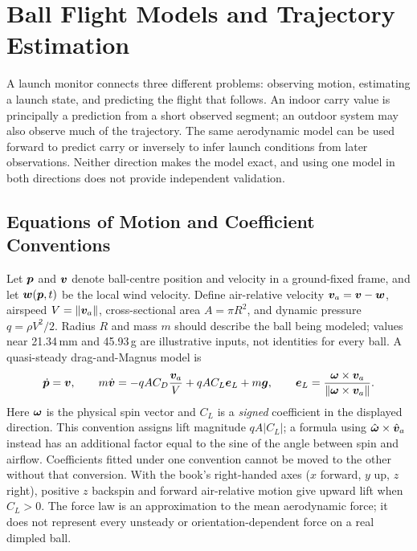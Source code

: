 \chapter{Ball Flight Models and Trajectory Estimation}
\label{ch:flight}

A launch monitor connects three different problems: observing motion, estimating a launch state, and predicting the flight that follows.
An indoor carry value is principally a prediction from a short observed segment; an outdoor system may also observe much of the trajectory.
The same aerodynamic model can be used forward to predict carry or inversely to infer launch conditions from later observations.
Neither direction makes the model exact, and using one model in both directions does not provide independent validation.

\section{Equations of Motion and Coefficient Conventions}

Let $\bm{p}$ and $\bm{v}$ denote ball-centre position and velocity in a ground-fixed frame, and let $\bm{w}(\bm{p},t)$ be the local wind velocity.
Define air-relative velocity $\bm{v}_a=\bm{v}-\bm{w}$, airspeed $V=\lVert\bm{v}_a\rVert$, cross-sectional area $A=\pi R^2$, and dynamic pressure $q=\rho V^2/2$.
Radius $R$ and mass $m$ should describe the ball being modeled; values near 21.34\,mm and 45.93\,g are illustrative inputs, not identities for every ball.
A quasi-steady drag-and-Magnus model is
\begin{equation}
\label{eq:eom}
\dot{\bm{p}}=\bm{v},\qquad
m\dot{\bm{v}}=-qAC_D\frac{\bm{v}_a}{V}
                   +qAC_L\bm{e}_L+m\bm{g},\qquad
\bm{e}_L=\frac{\bm{\omega}\times\bm{v}_a}
                    {\lVert\bm{\omega}\times\bm{v}_a\rVert}.
\end{equation}
Here $\bm{\omega}$ is the physical spin vector and $C_L$ is a \emph{signed} coefficient in the displayed direction.
This convention assigns lift magnitude $qA|C_L|$; a formula using $\hat{\bm{\omega}}\times\hat{\bm{v}}_a$ instead has an additional factor equal to the sine of the angle between spin and airflow.
Coefficients fitted under one convention cannot be moved to the other without that conversion.
With the book's right-handed axes ($x$ forward, $y$ up, $z$ right), positive $z$ backspin and forward air-relative motion give upward lift when $C_L>0$.
The force law is an approximation to the mean aerodynamic force; it does not represent every unsteady or orientation-dependent force on a real dimpled ball.

